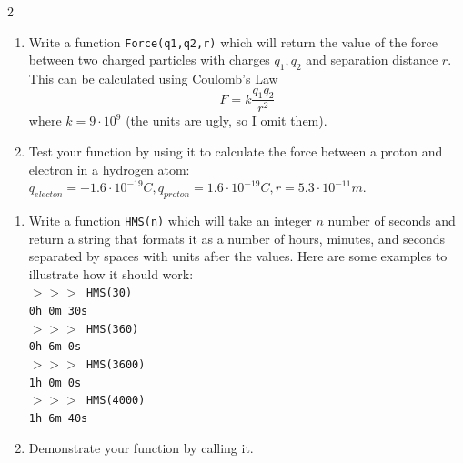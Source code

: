 \documentclass[12pt]{article}%
\newcommand{\code}[1]{\texttt{#1}}
\newcommand{\shp}{$>>>$ }
\begin{document}
\begin{multicols*}{2}

\begin{Exercise}[origin={25 points}]

\begin{enumerate}
\item Write a function \code{Force(q1,q2,r)} which will return the value of the force between two charged particles with charges $q_1,q_2$ and separation distance $r$. This can be calculated using Coulomb's Law
\begin{equation*}
F = k \frac{q_1 q_2}{r^2}
\end{equation*}
where $k = 9 \cdot 10^9$ (the units are ugly, so I omit them).
\item Test your function by using it to calculate the force between a proton and electron in a hydrogen atom: $q_{electon} = -1.6 \cdot 10^{-19} C, q_{proton} = 1.6 \cdot 10^{-19} C, r = 5.3 \cdot 10^{-11} m$.
\end{enumerate}


\end{Exercise}

\begin{Exercise}[origin={25 points}]

\begin{enumerate}
\item Write a function \code{HMS(n)} which will take an integer $n$ number of seconds and return a string that formats it as a number of hours, minutes, and seconds separated by spaces with units after the values. Here are some examples to illustrate how it should work: \\
\code{\shp HMS(30) \\
0h 0m 30s \\
\shp HMS(360) \\
0h 6m 0s \\
\shp HMS(3600) \\
1h 0m 0s \\
\shp HMS(4000) \\
1h 6m 40s
}
\item Demonstrate your function by calling it.
\end{enumerate}

\end{Exercise}

\vfill\null
\columnbreak

\begin{Exercise}[origin={25 points}]


\end{Exercise}
\end{multicols*}
\end{document}
